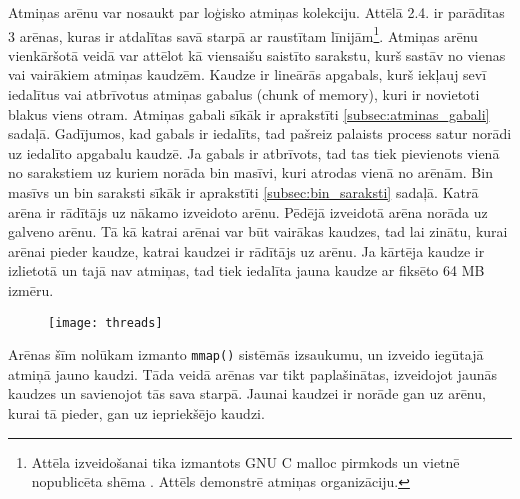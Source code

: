 Atmiņas arēnu var nosaukt par loģisko atmiņas kolekciju. Attēlā 2.4. ir parādītas 3 arēnas, kuras ir atdalītas savā starpā ar raustītam līnijām\footnote{Attēla izveidošanai tika izmantots GNU C malloc pirmkods \cite {MALLOC} un vietnē nopublicēta shēma \cite{AMM}. Attēls demonstrē atmiņas organizāciju.}.
 Atmiņas arēnu  vienkāršotā veidā var attēlot kā viensaišu saistīto sarakstu, kurš sastāv no vienas vai vairākiem atmiņas kaudzēm. 
 Kaudze ir lineārās apgabals, kurš iekļauj sevī iedalītus vai atbrīvotus atmiņas gabalus (chunk of memory), kuri ir novietoti blakus viens otram.
 Atmiņas gabali sīkāk ir aprakstīti \ref{subsec:atminas_gabali} sadaļā.
 Gadījumos, kad gabals ir iedalīts, tad pašreiz palaists process satur norādi uz iedalīto apgabalu kaudzē. 
 Ja gabals ir atbrīvots, tad tas tiek pievienots vienā no sarakstiem uz kuriem norāda bin masīvi, kuri atrodas vienā no arēnām.
Bin masīvs un bin saraksti sīkāk ir aprakstīti \ref{subsec:bin_saraksti} sadaļā. 
 Katrā arēna ir rādītājs uz nākamo izveidoto arēnu. Pēdējā izveidotā arēna norāda uz galveno arēnu.
 Tā kā katrai arēnai var būt vairākas kaudzes, tad lai zinātu, kurai arēnai pieder kaudze, katrai kaudzei ir rādītājs uz arēnu.
 Ja kārtēja kaudze ir izlietotā un tajā nav atmiņas, tad tiek iedalīta jauna kaudze ar fiksēto 64 MB izmēru.
\begin{figure}[h]
\begin{center}
\texttt{[image: threads]}
\end{center}
\caption{\textbf{\fontsize{11}{12}\selectfont {Arēnas GNU C bibliotēkā (versija 2.3)}}}
\end{figure}
 Arēnas šīm nolūkam izmanto \texttt{mmap()} sistēmās izsaukumu, un izveido iegūtajā atmiņā jauno kaudzi. 
  Tāda veidā arēnas var tikt paplašinātas, izveidojot jaunās kaudzes un savienojot tās sava starpā.
 Jaunai kaudzei ir norāde gan uz arēnu, kurai tā pieder, gan uz iepriekšējo kaudzi.

